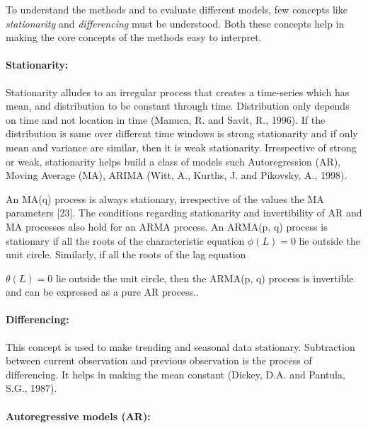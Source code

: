\documentclass[
  onepage,
  openany]{scrbook}
\let\oldparagraph\paragraph
\renewcommand{\paragraph}[1]{\oldparagraph{#1}\mbox{}}
\begin{document}
To understand the methods and to evaluate different models, few concepts
like \emph{stationarity} and \emph{differencing} must be understood.
Both these concepts help in making the core concepts of the methods easy
to interpret.

\hypertarget{stationarity}{%
\paragraph{\texorpdfstring{\textbf{Stationarity:}}{Stationarity:}}\label{stationarity}}

Stationarity alludes to an irregular process that creates a time-series
which has mean, and distribution to be constant through time.
Distribution only depends on time and not location in time (Manuca, R.
and Savit, R., 1996). If the distribution is same over different time
windows is strong stationarity and if only mean and variance are
similar, then it is weak stationarity. Irrespective of strong or weak,
stationarity helps build a class of models such Autoregression (AR),
Moving Average (MA), ARIMA (Witt, A., Kurths, J. and Pikovsky, A.,
1998).

An MA(q) process is always stationary, irrespective of the values the MA
parameters {[}23{]}. The conditions regarding stationarity and
invertibility of AR and MA processes also hold for an ARMA process. An
ARMA(p, q) process is stationary if all the roots of the characteristic
equation \(\phi (L) = 0\) lie outside the unit circle. Similarly, if all
the roots of the lag equation

\(\theta (L) = 0\) lie outside the unit circle, then the ARMA(p, q)
process is invertible and can be expressed as a pure AR process..

\hypertarget{differencing}{%
\paragraph{\texorpdfstring{\textbf{Differencing:}}{Differencing:}}\label{differencing}}

This concept is used to make trending and seasonal data stationary.
Subtraction between current observation and previous observation is the
process of differencing. It helps in making the mean constant (Dickey,
D.A. and Pantula, S.G., 1987).

\hypertarget{autoregressive-models-ar}{%
\paragraph{\texorpdfstring{\textbf{Autoregressive models
(AR):}}{Autoregressive models (AR):}}\label{autoregressive-models-ar}}
\end{document}
